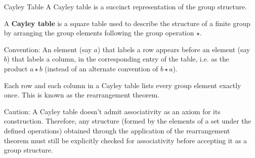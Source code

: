 \documentclass{beamer}
\newcommand\boldtext[1]{\textcolor{bolds}{\textbf{#1}}}
\begin{document}
\begin{frame}{Cayley Table}
    A Cayley table is a succinct representation of the group structure.
    \begin{definition}
        A \boldtext{Cayley table} is a square table used to describe the structure of a finite group by arranging the group elements following the group operation $\star$.
    \end{definition}
    Convention: An element (say $a$) that labels a row appears before an element (say $b$) that labels a column, in the corresponding entry of the table, i.e. as the product $a\star b$ (instead of an alternate convention of $b\star a$).
    \begin{theorem}
        Each row and each column in a Cayley table lists every group element exactly once. This is known as the rearrangement theorem.
    \end{theorem}
    Caution: A Cayley table doesn't admit associativity as an axiom for its construction. Therefore, any structure (formed by the elements of a set under the defined operations) obtained through the application of the rearrangement theorem must still be explicitly checked for associativity before accepting it as a group structure.
\end{frame}
\end{document}
